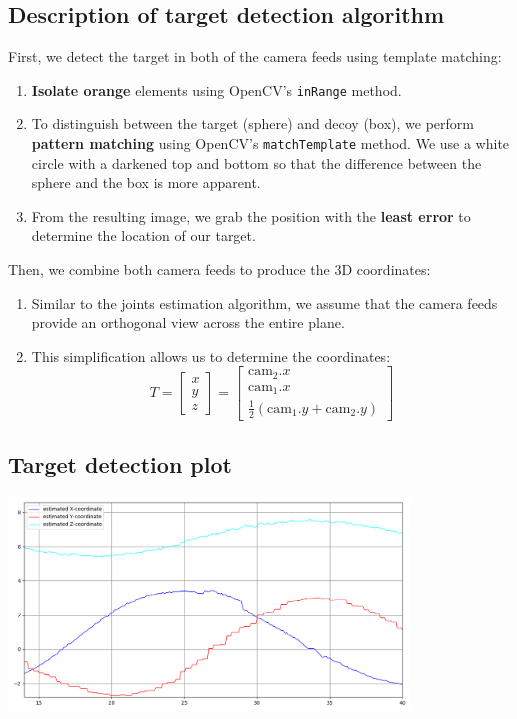 \subsection{Description of target detection algorithm}
First, we detect the target in both of the camera feeds using 
template matching:
\begin{enumerate}
    \item \textbf{Isolate orange} elements using OpenCV's \texttt{inRange}
        method.
    \item 
        To distinguish between the target (sphere) and decoy
        (box), we perform \textbf{pattern matching} using OpenCV's
        \texttt{matchTemplate} method.
        We use a white circle with a darkened top and bottom
        so that the difference between the sphere and the box
        is more apparent.
    \item
        From the resulting image, we grab the position with the
        \textbf{least error} to determine the location of our target.
\end{enumerate}
Then, we combine both camera feeds to produce the 3D coordinates:
\begin{enumerate}
    \item
        Similar to the joints estimation algorithm, we assume that
        the camera feeds provide an orthogonal view across the
        entire plane.
    \item
        This simplification allows us to determine the coordinates:
        \[
            T = \begin{bmatrix} x \\ y \\ z \end{bmatrix} =
            \begin{bmatrix} 
                \text{cam}_2.x \\
                \text{cam}_1.x \\
                \frac{1}{2} (\text{cam}_1.y + \text{cam}_2.y)
            \end{bmatrix} 
        \]
\end{enumerate}

\subsection{Target detection plot}
\begin{center}
    \includegraphics[width=0.8\textwidth]{plots/q2_2.png}
\end{center}
